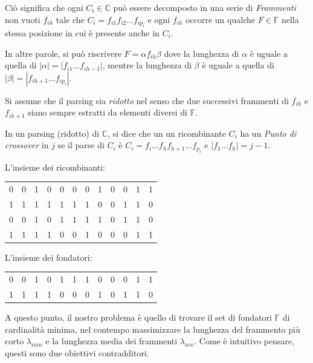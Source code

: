 Ciò significa che ogni $C_i \in \mathbb{C}$ può essere decomposto in una serie di \textit{Frammenti} non vuoti $f_{ih}$ tale che $C_i=f_{i1}f_{i2}...f_{ip_i}$ e ogni $f_{ih}$ occorre un qualche $F \in \mathbb{F}$ nella stessa posizione in cui è presente anche in $C_i$. 

In altre parole, si può riscrivere $F=\alpha f_{ih} \beta$ dove la lunghezza di $\alpha$ è uguale a quella di $|\alpha|=|f_{i1}...f_{ih-1}|$, mentre la lunghezza di $\beta$ è uguale a quella di $|\beta|=|f_{ih+1}...f_{ip_i}|$.

Si assume che il parsing sia \textit{ridotto} nel senso che due successivi frammenti di $f_{ih}$ e $f_{ih+1}$ siano sempre estratti da elementi diversi di $\mathbb{F}$.

In un parsing (ridotto) di $\mathbb{C}$, si dice che un un ricombinante $C_i$ ha un \textit{Punto di crossover} in $j$ se il parse di $C_i$ è  $C_i=f_i...f_hf_{h+1}...f_{p_i}$ e $|f_1...f_h|=j-1$.

\begin{example}
L'insieme dei ricombinanti:
\begin{center}
  \begin{tabular}{ c c c c c c c c c c c c}
    0 & 0 & 1 & 0 & 0 & 0 & 0 & 1 & 0 & 0 & 1 & 1 \\ 
    1 & 1 & 1 & 1 & 1 & 1 & 1 & 0 & 0 & 1 & 1 & 0 \\
    0 & 0 & 1 & 0 & 1 & 1 & 1 & 1 & 0 & 1 & 1 & 0 \\ 
    1 & 1 & 1 & 1 & 0 & 0 & 1 & 0 & 0 & 0 & 1 & 1 \\
  \end{tabular}
\end{center}

L'insieme dei fondatori:
\begin{center}
  \begin{tabular}{ c c c c c c c c c c c c}
    0 & 0 & 1 & 0 & 1 & 1 & 1 & 0 & 0 & 0 & 1 & 1 \\ 
    1 & 1 & 1 & 1 & 0 & 0 & 0 & 1 & 0 & 1 & 1 & 0 \\
  \end{tabular}
\end{center}
\end{example}

\newpage

A questo punto, il nostro problema è quello di trovare il set di fondatori $\mathbb{F}$ di cardinalità minima, nel contempo massimizzare la lunghezza del frammento più corto $\lambda_{min}$ e la lunghezza media dei frammenti $\lambda_{ave}$. Come è intuitivo pensare, questi sono due obiettivi contradditori.

